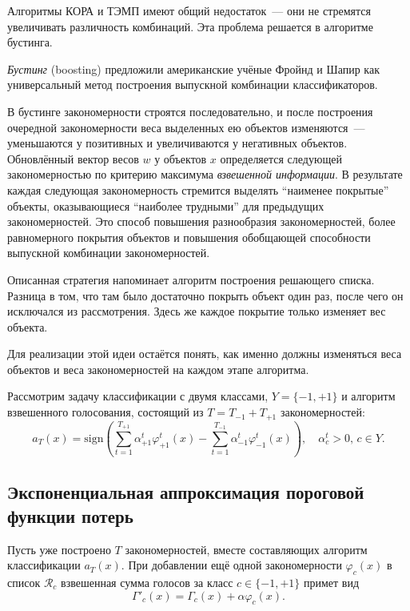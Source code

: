 Алгоритмы КОРА и ТЭМП имеют общий недостаток~--- они не стремятся увеличивать различность комбинаций. Эта проблема решается в алгоритме бустинга.

\textit{Бустинг} (boosting) предложили американские учёные Фройнд и Шапир как универсальный метод построения выпускной комбинации классификаторов. 

В бустинге закономерности строятся последовательно, и после построения очередной закономерности веса выделенных ею объектов изменяются~--- уменьшаются у позитивных и увеличиваются у негативных объектов. Обновлённый вектор весов $w$ у объектов $x$ определяется следующей закономерностью по критерию максимума \textit{взвешенной информации}. В результате каждая следующая закономерность стремится выделять ``наименее покрытые'' объекты, оказывающиеся ``наиболее трудными'' для предыдущих закономерностей. Это способ повышения разнообразия закономерностей, более равномерного покрытия объектов и повышения обобщающей способности выпускной комбинации закономерностей.

Описанная стратегия напоминает алгоритм построения решающего списка. Разница в том, что там было достаточно покрыть объект один раз, после чего он исключался из рассмотрения. Здесь же каждое покрытие только изменяет вес объекта.

Для реализации этой идеи остаётся понять, как именно должны изменяться веса объектов и веса закономерностей на каждом этапе алгоритма.

Рассмотрим задачу классификации с двумя классами, $Y = \{-1, +1\}$ и алгоритм взвешенного голосования, состоящий из $T = T_{-1} + T_{+1}$ закономерностей:
\begin{equation}
    a_T(x) = \text{sign}\left( \sum_{t=1}^{T_{+1}} \alpha^t_{+1} \varphi^t_{+1}(x) - \sum_{t=1}^{T_{-1}} \alpha^t_{-1} \varphi^t_{-1}(x) \right), \quad \alpha^t_c > 0, \, c \in Y.
\end{equation}

\subsection*{Экспоненциальная аппроксимация пороговой функции потерь}

Пусть уже построено $T$ закономерностей, вместе составляющих алгоритм классификации $a_T(x)$. При добавлении ещё одной закономерности $\varphi_c(x)$ в список $\mathcal{R}_c$ взвешенная сумма голосов за класс $c \in \{-1, +1\}$ примет вид
\begin{equation}
    \Gamma'_c(x) = \Gamma_c(x) + \alpha \varphi_c(x).
\end{equation}

